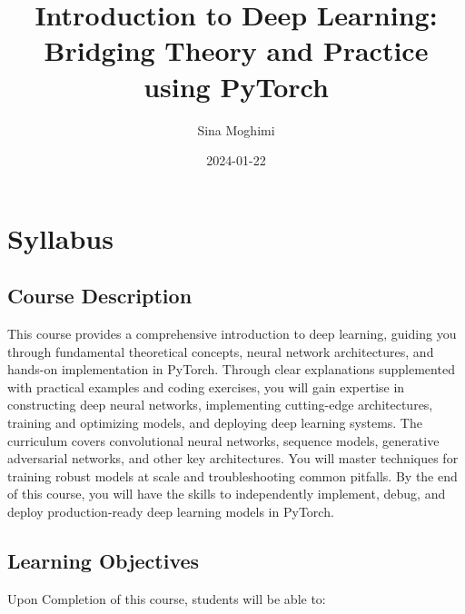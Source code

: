 \documentclass[
]{book}
\title{Introduction to Deep Learning: Bridging Theory and Practice using PyTorch}
\author{Sina Moghimi}
\date{2024-01-22}
\begin{document}
\maketitle

{
\setcounter{tocdepth}{1}
\tableofcontents
}
\hypertarget{syllabus}{%
\chapter{Syllabus}\label{syllabus}}

\hypertarget{course-description}{%
\section{Course Description}\label{course-description}}

This course provides a comprehensive introduction to deep learning, guiding you through fundamental theoretical concepts, neural network architectures, and hands-on implementation in PyTorch. Through clear explanations supplemented with practical examples and coding exercises, you will gain expertise in constructing deep neural networks, implementing cutting-edge architectures, training and optimizing models, and deploying deep learning systems. The curriculum covers convolutional neural networks, sequence models, generative adversarial networks, and other key architectures. You will master techniques for training robust models at scale and troubleshooting common pitfalls. By the end of this course, you will have the skills to independently implement, debug, and deploy production-ready deep learning models in PyTorch.

\hypertarget{learning-objectives}{%
\section{Learning Objectives}\label{learning-objectives}}

Upon Completion of this course, students will be able to:
\end{document}
